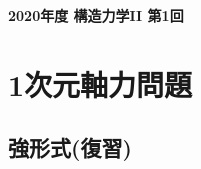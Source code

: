 \documentclass[10pt,a4j]{jarticle}
\newlength{\minitwocolumn}
\begin{document}
\newcommand{\fat}[1]{\mbox{\boldmath $#1$}}
\newcommand{\D}{\partial}
\newcommand{\w}{\omega}
\newcommand{\ga}{\alpha}
\newcommand{\gb}{\beta}
\newcommand{\gx}{\xi}
\newcommand{\gz}{\zeta}
\newcommand{\vhat}[1]{\hat{\fat{#1}}}
\newcommand{\spc}{\vspace{0.7\baselineskip}}
\newcommand{\halfspc}{\vspace{0.3\baselineskip}}

\newcommand{\twofig}[2]
 {
   \begin{figure}
     \begin{minipage}[t]{\minitwocolumn}
         \begin{center}   #1
         \end{center}
     \end{minipage}
         \hspace{\columnsep}
     \begin{minipage}[t]{\minitwocolumn}
         \begin{center} #2
         \end{center}
     \end{minipage}
   \end{figure}
 }
\begin{center}
	{\Large \bf 2020年度 構造力学II 第1回} \\
\end{center}
\section{1次元軸力問題}
\subsection{強形式(復習)}
\end{document}

